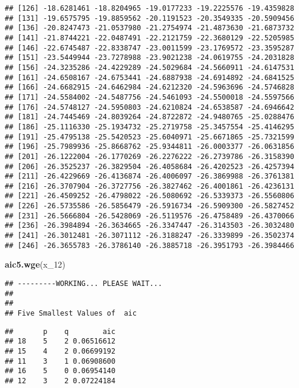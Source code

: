 \documentclass[]{article}
\newenvironment{Shaded}{\begin{snugshade}}{\end{snugshade}}
\newcommand{\DecValTok}[1]{\textcolor[rgb]{0.00,0.00,0.81}{#1}}
\newcommand{\KeywordTok}[1]{\textcolor[rgb]{0.13,0.29,0.53}{\textbf{#1}}}
\newcommand{\NormalTok}[1]{#1}
\begin{document}
\begin{verbatim}
## [126] -18.6281461 -18.8204965 -19.0177233 -19.2225576 -19.4359828
## [131] -19.6575795 -19.8859562 -20.1191523 -20.3549335 -20.5909456
## [136] -20.8247473 -21.0537980 -21.2754974 -21.4873630 -21.6873732
## [141] -21.8744221 -22.0487491 -22.2121759 -22.3680129 -22.5205985
## [146] -22.6745487 -22.8338747 -23.0011599 -23.1769572 -23.3595287
## [151] -23.5449944 -23.7278988 -23.9021238 -24.0619755 -24.2031828
## [156] -24.3235286 -24.4229289 -24.5029684 -24.5660911 -24.6147531
## [161] -24.6508167 -24.6753441 -24.6887938 -24.6914892 -24.6841525
## [166] -24.6682915 -24.6462984 -24.6212320 -24.5963696 -24.5746828
## [171] -24.5584002 -24.5487756 -24.5461093 -24.5500018 -24.5597566
## [176] -24.5748127 -24.5950803 -24.6210824 -24.6538587 -24.6946642
## [181] -24.7445469 -24.8039264 -24.8722872 -24.9480765 -25.0288476
## [186] -25.1116330 -25.1934732 -25.2719758 -25.3457554 -25.4146295
## [191] -25.4795138 -25.5420523 -25.6040971 -25.6671865 -25.7321599
## [196] -25.7989936 -25.8668762 -25.9344811 -26.0003377 -26.0631856
## [201] -26.1222004 -26.1770269 -26.2276222 -26.2739786 -26.3158390
## [206] -26.3525237 -26.3829504 -26.4058684 -26.4202523 -26.4257394
## [211] -26.4229669 -26.4136874 -26.4006097 -26.3869988 -26.3761381
## [216] -26.3707904 -26.3727756 -26.3827462 -26.4001861 -26.4236131
## [221] -26.4509252 -26.4798022 -26.5080692 -26.5339373 -26.5560806
## [226] -26.5735586 -26.5856479 -26.5916734 -26.5909300 -26.5827452
## [231] -26.5666804 -26.5428069 -26.5119576 -26.4758489 -26.4370066
## [236] -26.3984894 -26.3634665 -26.3347447 -26.3143503 -26.3032480
## [241] -26.3012481 -26.3071112 -26.3188247 -26.3339899 -26.3502374
## [246] -26.3655783 -26.3786140 -26.3885718 -26.3951793 -26.3984466
\end{verbatim}

\begin{Shaded}
\begin{Highlighting}[]
\KeywordTok{aic5.wge}\NormalTok{(x_}\DecValTok{12}\NormalTok{)}
\end{Highlighting}
\end{Shaded}

\begin{verbatim}
## ---------WORKING... PLEASE WAIT... 
## 
## 
## Five Smallest Values of  aic
\end{verbatim}

\begin{verbatim}
##       p    q        aic
## 18    5    2 0.06516612
## 15    4    2 0.06699192
## 11    3    1 0.06908600
## 16    5    0 0.06954140
## 12    3    2 0.07224184
\end{verbatim}
\end{document}
